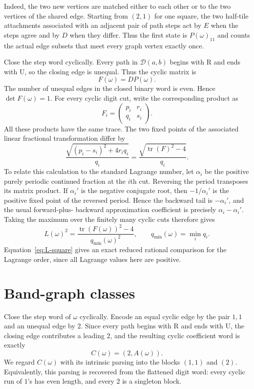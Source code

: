 \documentclass[11pt]{amsart}
\theoremstyle{definition}
\newcommand{\RR}{\mathrm{R}}
\newcommand{\UU}{\mathrm{U}}
\newcommand{\cD}{\mathcal D}
\newcommand{\tr}{\operatorname{tr}}
\begin{document}
Indeed, the two new vertices are matched either to each other or to the two
vertices of the shared edge.  Starting from $(2,1)$ for one square, the two
half-tile attachments associated with an adjacent pair of path steps act by
$E$ when the steps agree and by $D$ when they differ.  Thus the first state is
$P(\omega)_{11}$ and counts the actual edge subsets that meet every graph
vertex exactly once.

Close the step word cyclically.  Every path in $\cD(a,b)$ begins with $\RR$
and ends with $\UU$, so the closing edge is unequal.  Thus the cyclic matrix is
\[
  F(\omega)=D P(\omega).
\]
The number of unequal edges in the closed binary word is even.  Hence
$\det F(\omega)=1$.  For every cyclic digit cut, write the corresponding
product as
\[
  F_i=\begin{pmatrix}p_i&r_i\\q_i&s_i\end{pmatrix}.
\]
All these products have the same trace.  The two fixed points of the associated
linear fractional transformation differ by
\[
  \frac{\sqrt{(p_i-s_i)^2+4r_iq_i}}{q_i}
  =\frac{\sqrt{\tr(F)^2-4}}{q_i}.
\]
To relate this calculation to the standard Lagrange number, let $\alpha_i$ be
the positive purely periodic continued fraction at the $i$th cut.  Reversing
the period transposes its matrix product.  If $\alpha_i'$ is the negative
conjugate root, then $-1/\alpha_i'$ is the positive fixed point of the reversed
period.  Hence the backward tail is $-\alpha_i'$, and the usual forward-plus-
backward approximation coefficient is precisely
$\alpha_i-\alpha_i'$.  Taking the maximum over the finitely many cyclic cuts
therefore gives
\begin{equation}\label{eq:L-square}
  L(\omega)^2=\frac{\tr(F(\omega))^2-4}{q_{\min}(\omega)^2},
  \qquad q_{\min}(\omega)=\min_i q_i.
\end{equation}
Equation~\eqref{eq:L-square} gives an exact reduced rational comparison for
the Lagrange order, since all Lagrange values here are positive.

\section{Band-graph classes}\label{sec:band-classes}

Close the step word of $\omega$ cyclically.  Encode an equal cyclic edge by
the pair $1,1$ and an unequal edge by $2$.  Since every path begins with $\RR$
and ends with $\UU$, the closing edge contributes a leading $2$, and the
resulting cyclic coefficient word is exactly
\[
 C(\omega)=(2,A(\omega)).
\]
We regard $C(\omega)$ with its intrinsic parsing into the blocks $(1,1)$ and
$(2)$.  Equivalently, this parsing is recovered from the flattened digit word:
every cyclic run of $1$'s has even length, and every $2$ is a singleton block.
\end{document}
